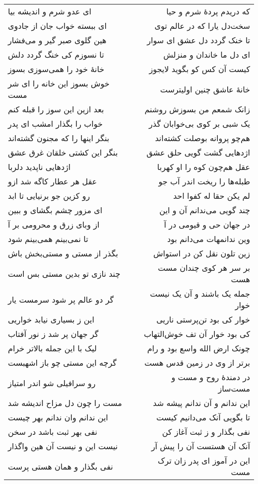\begin{center}
\begin{longtable}{l p{0.5cm} r}
\\
ای عدو شرم و اندیشه بیا
&&
که دریدم پردهٔ شرم و حیا
\\
ای ببسته خواب جان از جادوی
&&
سخت‌دل یارا که در عالم توی
\\
هین گلوی صبر گیر و می‌فشار
&&
تا خنک گردد دل عشق ای سوار
\\
تا نسوزم کی خنگ گردد دلش
&&
ای دل ما خاندان و منزلش
\\
خانهٔ خود را همی‌سوزی بسوز
&&
کیست آن کس کو بگوید لایجوز
\\
خوش بسوز این خانه را ای شر مست
&&
خانهٔ عاشق چنین اولیترست
\\
بعد ازین این سوز را قبله کنم
&&
زانک شمعم من بسوزش روشنم
\\
خواب را بگذار امشب ای پدر
&&
یک شبی بر کوی بی‌خوابان گذر
\\
بنگر اینها را که مجنون گشته‌اند
&&
هم‌چو پروانه بوصلت کشته‌اند
\\
بنگر این کشتی خلقان غرق عشق
&&
اژدهایی گشت گویی حلق عشق
\\
اژدهایی ناپدید دلربا
&&
عقل هم‌چون کوه را او کهربا
\\
عقل هر عطار کاگه شد ازو
&&
طبله‌ها را ریخت اندر آب جو
\\
رو کزین جو برنیایی تا ابد
&&
لم یکن حقا له کفوا احد
\\
ای مزور چشم بگشای و ببین
&&
چند گویی می‌ندانم آن و این
\\
از وبای زرق و محرومی بر آ
&&
در جهان حی و قیومی در آ
\\
تا نمی‌بینم همی‌بینم شود
&&
وین ندانمهات می‌دانم بود
\\
بگذر از مستی و مستی‌بخش باش
&&
زین تلون نقل کن در استواش
\\
چند نازی تو بدین مستی بس است
&&
بر سر هر کوی چندان مست هست
\\
گر دو عالم پر شود سرمست یار
&&
جمله یک باشند و آن یک نیست خوار
\\
این ز بسیاری نیابد خواریی
&&
خوار کی بود تن‌پرستی ناریی
\\
گر جهان پر شد ز نور آفتاب
&&
کی بود خوار آن تف خوش‌التهاب
\\
لیک با این جمله بالاتر خرام
&&
چونک ارض الله واسع بود و رام
\\
گرچه این مستی چو باز اشهبست
&&
برتر از وی در زمین قدس هست
\\
رو سرافیلی شو اندر امتیاز
&&
در دمندهٔ روح و مست و مست‌ساز
\\
مست را چون دل مزاح اندیشه شد
&&
این ندانم و آن ندانم پیشه شد
\\
این ندانم وان ندانم بهر چیست
&&
تا بگویی آنک می‌دانیم کیست
\\
نفی بهر ثبت باشد در سخن
&&
نفی بگذار و ز ثبت آغاز کن
\\
نیست این و نیست آن هین واگذار
&&
آنک آن هستست آن را پیش آر
\\
نفی بگذار و همان هستی پرست
&&
این در آموز ای پدر زان ترک مست
\\
\end{longtable}
\end{center}
